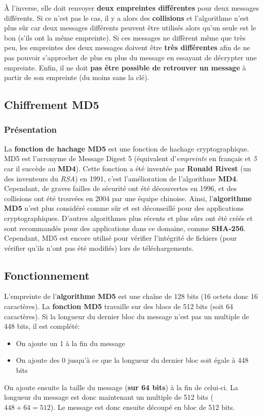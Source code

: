 \documentclass[12pt, a4paper]{article}
\begin{document}
À l'inverse, elle doit renvoyer \textbf{deux empreintes différentes} pour deux messages différents.
Si ce n'est pas le cas, il y a alors des \textbf{collisions} et l'algorithme n'est plus sûr
car deux messages différents peuvent être utilisés alors qu'un seule est le bon (s'ils ont la même empreinte).
Si ces messages ne diffèrent même que très peu, les empreintes des deux messages doivent être \textbf{très différentes}
 afin de ne pas pouvoir s'approcher de plus en plus du message en essayant de décrypter une empreinte.
Enfin, il ne doit \textbf{pas être possible de retrouver un message} à partir de son empreinte (du moins sans la clé).

\subsection{Chiffrement MD5}

\subsubsection*{Présentation}\label{md5_presentation}

La \textbf{fonction de hachage MD5} est une fonction de hachage cryptographique.
MD5 est l'acronyme de Message Digest 5 (équivalent d'\textit{empreinte} en français et \textit{5} car il succède au \textbf{MD4}).
Cette fonction a été inventée par \textbf{Ronald Rivest} (un des inventeurs du \textit{RSA}) en 1991,
c'est l'amélioration de l'algorithme \textbf{MD4}.
Cependant, de graves failles de sécurité ont été découvertes en 1996,
et des collisions ont été trouvées en 2004 par une équipe chinoise.
Ainsi, l'\textbf{algorithme MD5} n'est plus considéré comme sûr et est déconseillé pour des applications cryptographiques.
D'autres algorithmes plus récents et plus sûrs ont été créés et sont recommandés pour des applications dans ce domaine,
comme \textbf{SHA-256}.
Cependant, MD5 est encore utilisé pour vérifier l'intégrité de fichiers (pour vérifier qu'ils n'ont pas été modifiés)
lors de téléchargements.

\subsection*{Fonctionnement}

L'empreinte de l'\textbf{algorithme MD5} est une chaîne de 128 bits (16 octets donc 16 caractères).
La \textbf{fonction MD5} travaille sur des blocs de 512 bits (soit 64 caractères).
Si la longueur du dernier bloc du message n'est pas un multiple de 448 bits, il est complété:
\begin{itemize}
    \item On ajoute un 1 à la fin du message
    \item On ajoute des 0 jusqu'à ce que la longueur du dernier bloc soit égale à 448 bits
\end{itemize}
\bigskip
On ajoute ensuite la taille du message (\textbf{sur 64 bits}) à la fin de celui-ci.
La longueur du message est donc maintenant un multiple de 512 bits ($448 + 64 = 512$).
Le message est donc ensuite découpé en bloc de 512 bits.
\end{document}
